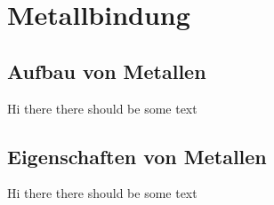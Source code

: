 \section{Metallbindung}

\subsection{Aufbau von Metallen}

Hi there there should be some text

\subsection{Eigenschaften von Metallen}

Hi there there should be some text